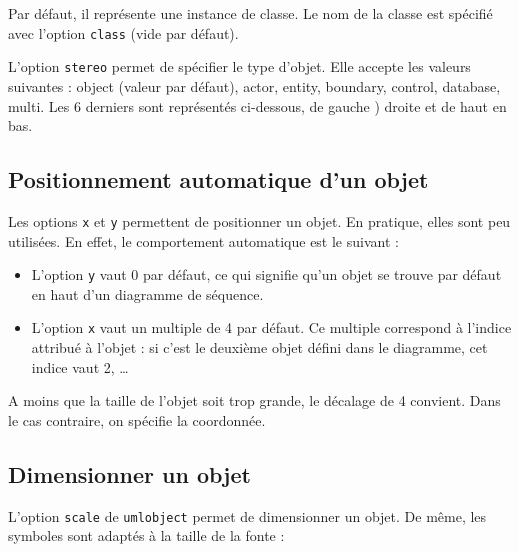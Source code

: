\documentclass[a4paper,11pt]{report}
\newcommand{\inputTikZ}[1]{%
  }%
\newcommand{\inputTikZ}[1]{%
    \texttt{[image: fig/\#1.pdf]}%
  }%
\begin{document}
\medskip

Par défaut, il représente une instance de classe. Le nom de la classe est spécifié avec l'option {\tt class} (vide par défaut). 

\medskip

L'option {\tt stereo} permet de spécifier le type d'objet. Elle accepte les valeurs suivantes : object (valeur par défaut), actor, entity, boundary, control, database, multi. Les 6 derniers sont représentés ci-dessous, de gauche ) droite et de haut en bas.

\medskip

\begin{minipage}{0.5\textwidth}

\end{minipage}
\begin{minipage}{0.5\textwidth}
\begin{center}
\inputTikZ{figure65}
\end{center}
\end{minipage}

\subsection{Positionnement automatique d'un objet}\label{ss.objpos}

Les options {\tt x} et {\tt y} permettent de positionner un objet. En pratique, elles sont peu utilisées. En effet, le comportement automatique est le suivant :

\begin{itemize}
\item L'option {\tt y} vaut 0 par défaut, ce qui signifie qu'un objet se trouve par défaut en haut d'un diagramme de séquence.
\item L'option {\tt x} vaut un multiple de 4 par défaut. Ce multiple correspond à l'indice attribué à l'objet : si c'est le deuxième objet défini dans le diagramme, cet indice vaut 2, \ldots
\end{itemize}

A moins que la taille de l'objet soit trop grande, le décalage de 4 convient. Dans le cas contraire, on spécifie la coordonnée.

\subsection{Dimensionner un objet}\label{ss.objdim}

L'option {\tt scale} de {\tt umlobject} permet de dimensionner un objet. De même, les symboles sont adaptés à la taille de la fonte :
\end{document}
